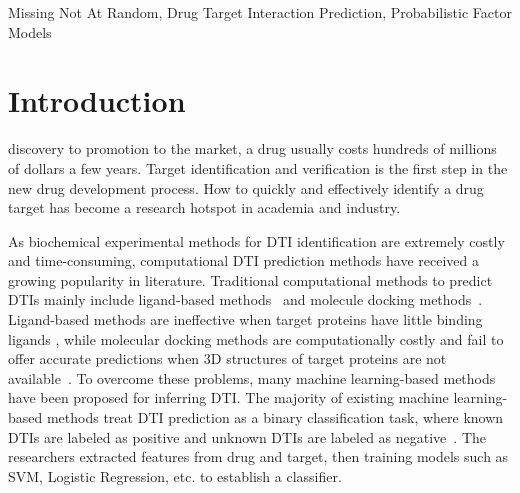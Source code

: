 \documentclass[journal]{IEEEtran}
\begin{document}
\begin{IEEEkeywords}
Missing Not At Random, Drug Target Interaction Prediction, Probabilistic Factor Models\end{IEEEkeywords}






%
\IEEEpeerreviewmaketitle



\section{Introduction}
% 
% 
% 
% 
 discovery to promotion to the market, a drug usually costs hundreds of millions of dollars a few years. Target identification and verification is the first step in the new drug development process. How to quickly and effectively identify a drug target has become a research hotspot in academia and industry.

As biochemical experimental methods for DTI identification are extremely costly and time-consuming, computational DTI prediction methods have received a growing popularity in literature. Traditional computational methods to predict DTIs mainly include ligand-based methods~\cite{Keiser2007ligand} and molecule docking methods~\cite{Cheng2007docking}. Ligand-based methods are ineffective when target proteins have little binding ligands , while molecular docking methods are computationally costly and fail to offer accurate predictions when 3D structures of target proteins are not available~\cite{Chen2016docking}. To overcome these problems, many machine learning-based methods have been proposed for inferring DTI. The majority of existing machine learning-based methods treat DTI prediction as a binary classification task, where known DTIs are labeled as positive and unknown DTIs are labeled as negative~\cite{Ding2013Similarity}. The researchers extracted features from drug and target, then training models such as SVM, Logistic Regression, etc. to establish a classifier.
\end{document}
